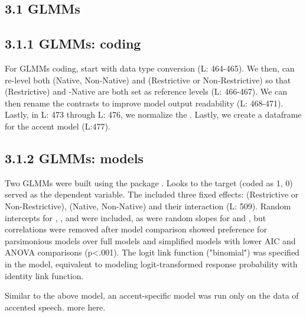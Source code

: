 \subsection{3.1 GLMMs}

\subsection{3.1.1 GLMMs: coding}

For GLMMs coding, start with data type conversion (L: 464-465). We then, can re-level both (Native, Non-Native) and (Restrictive or Non-Restrictive) so that (Restrictive) and -Native are both set as reference levels (L: 466-467).  We can then rename the contrasts to improve model output readability (L: 468-471). Lastly, in L: 473 through L: 476, we normalize the . Lastly, we create a dataframe for the accent model (L:477).



\subsection{3.1.2 GLMMs: models}

Two GLMMs were built using the  package \parencite{Bates2014-eq}.  Looks to the target (coded as 1, 0) served as the dependent variable. The  included three fixed effects:  (Restrictive or Non-Restrictive), (Native, Non-Native) and their interaction (L: 509). Random intercepts for ,
, and
 were included, as were random slopes for  and , but correlations were removed after model comparison showed preference for parsimonious models over full models and simplified models with lower AIC and ANOVA comparisons (p<.001). The logit link function ("binomial") was specified in the model, equivalent to modeling logit-transformed response probability with identity link function. 



Similar to the above model, an accent-specific model was run only on the data of accented speech. more here.



